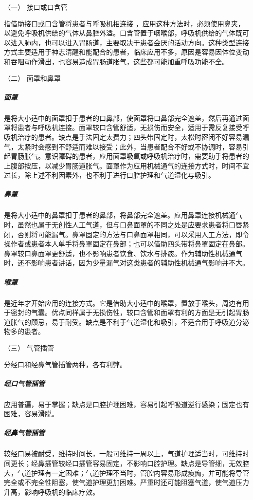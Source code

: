 \hypertarget{text00369.htmlux5cux23CHP16-3-3-1-1}{}
（一） 接口或口含管

指借助接口或口含管将患者与呼吸机相连接
，应用这种方法时，必须使用鼻夹，以避免呼吸机供给的气体从鼻腔外溢。口含管置于咽喉部，呼吸机供给的气体既可以进入肺内，也可以进入胃肠道，主要取决于患者会厌的活动方向。这种类型连接方式主要适用于神志清醒和能配合的患者，临床应用不多，原因是容易因体位变动和吞咽动作滑出，也容易造成胃肠道胀气，这些都可能加重呼吸功能不全。

\hypertarget{text00369.htmlux5cux23CHP16-3-3-1-2}{}
（二） 面罩和鼻罩

\subparagraph{面罩}

是将大小适中的面罩扣于患者的口鼻部，使面罩将口鼻部完全遮盖，然后再通过面罩将患者与呼吸机连接。面罩较口含管舒适，无损伤而安全，适用于需反复接受呼吸机治疗的患者。缺点是手法固定太费力；四头带固定时，太松时密闭不好容易漏气，太紧时会感到不舒适而难以接受；此外，当患者配合不好或不协调时，容易引起胃肠胀气。意识障碍的患者，应用面罩吸氧或呼吸机治疗时，需要助手将患者的上腹部按压，以减少胃肠道胀气。面罩作为应用机械通气的连接方式时，时间不宜过长，除上述不利因素外，也不利于进行口腔护理和气道湿化与吸引。

\subparagraph{鼻罩}

是将大小适中的鼻罩扣于患者的鼻部，将鼻部完全遮盖。应用鼻罩连接机械通气时，虽然也属于无创性人工气道，但与口鼻面罩的不同之处是应要求患者将口唇紧闭，否则将可能漏气。鼻罩固定的方法与口鼻面罩相同，可以采用人工方法，即令操作者或患者本人单手将鼻罩固定在鼻部；也可以借助四头带将鼻罩固定在鼻部。鼻罩较口鼻面罩更舒适，也不影响患者饮食、饮水与排痰。作为辅助性机械通气时，还不影响患者讲话，因为少量漏气对这类患者的辅助性机械通气影响并不大。

\subparagraph{喉罩}

是近年才开始应用的连接方式。它是借助大小适中的喉罩，置放于喉头，周边有用于密封的气囊。优点同样属于无损伤性，较口含管和面罩有利的方面是无引起胃肠道胀气的顾忌，易于耐受。缺点是不利于气道湿化和吸引，不适合用于呼吸道分泌物多的患者。

\hypertarget{text00369.htmlux5cux23CHP16-3-3-1-3}{}
（三） 气管插管

分经口和经鼻气管插管两种，各有利弊。

\subparagraph{经口气管插管}

应用普遍，易于掌握；缺点是口腔护理困难，容易引起呼吸道逆行感染；固定也有困难，容易滑脱。

\subparagraph{经鼻气管插管}

较经口易被耐受，维持时间长，一般可维持一周以上，气道护理适当时，可维持时间更长；经鼻插管较经口插管容易固定，不影响口腔护理。缺点是导管细，无效腔大，气道护理有一定困难；气道护理不当时，管腔内容易形成痰痂，并可能将导管完全或不完全性阻塞，使气道护理更加困难。严重时还可能阻塞气道，使气道压力升高，影响呼吸机的临床疗效。

